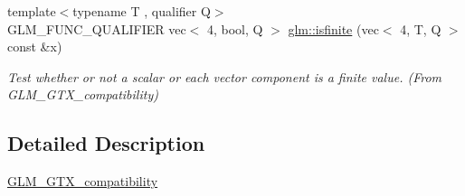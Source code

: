 \begin{DoxyCompactItemize}
{\footnotesize template$<$typename T , qualifier Q$>$ }\\G\+L\+M\+\_\+\+F\+U\+N\+C\+\_\+\+Q\+U\+A\+L\+I\+F\+I\+ER vec$<$ 4, bool, Q $>$ \hyperlink{group__gtx__compatibility_ga19925badbe10ce61df1d0de00be0b5ad}{glm\+::isfinite} (vec$<$ 4, T, Q $>$ const \&x)
\begin{DoxyCompactList}\small\item\em Test whether or not a scalar or each vector component is a finite value. (From G\+L\+M\+\_\+\+G\+T\+X\+\_\+compatibility) \end{DoxyCompactList}\end{DoxyCompactItemize}


\subsection{Detailed Description}
\hyperlink{group__gtx__compatibility}{G\+L\+M\+\_\+\+G\+T\+X\+\_\+compatibility} 